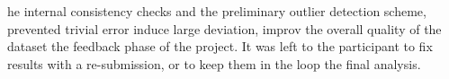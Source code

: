 he internal consistency checks and the preliminary outlier detection scheme,  
prevented  trivial error  induce  
large deviation,  improv the overall quality of the 
dataset  the feedback phase of the project. It was left to the 
participant to fix  results with a re-submission, or to keep 
them in the loop  the final analysis.

